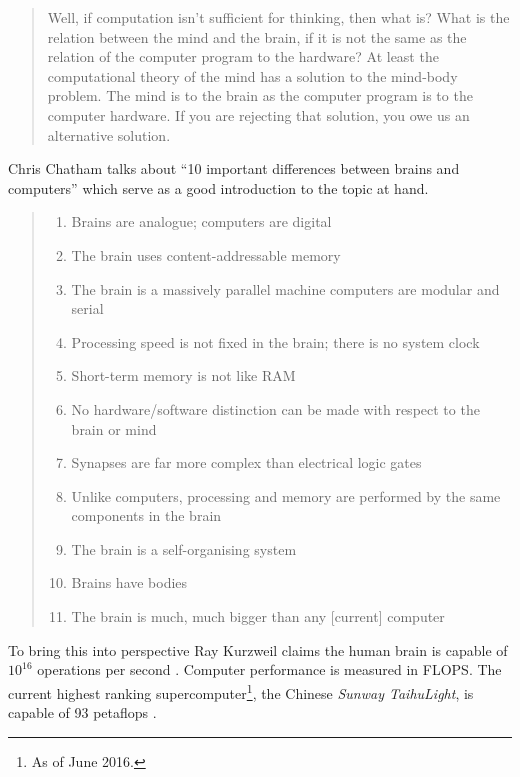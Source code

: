 \begin{quotation}
  Well, if computation isn’t sufficient for thinking, then what is? What is the relation between the mind and the brain, if it is not the same as the relation of the computer program to the hardware? At least the computational theory of the mind has a solution to the mind-body problem. The mind is to the brain as the computer program is to the computer hardware. If you are rejecting that solution, you owe us an alternative solution.
\end{quotation}

Chris Chatham talks about ``10 important differences between brains and computers'' \autocite*{Chatham2007} which serve as a good introduction to the topic at hand.

\begin{quotation}
  \begin{enumerate}
    \item Brains are analogue; computers are digital
    \item The brain uses content-addressable memory
    \item The brain is a massively parallel machine computers are modular and serial
    \item Processing speed is not fixed in the brain; there is no system clock
    \item Short-term memory is not like RAM
    \item No hardware/software distinction can be made with respect to the brain or mind
    \item Synapses are far more complex than electrical logic gates
    \item Unlike computers, processing and memory are performed by the same components in the brain
    \item The brain is a self-organising system
    \item Brains have bodies
    \item	The brain is much, much bigger than any [current] computer
  \end{enumerate}
\end{quotation}

To bring this into perspective Ray Kurzweil claims the human brain is capable of $10^{16}$ operations per second \autocite*{Kurzweil2013}. Computer performance is measured in \ac{FLOPS}. The current highest ranking supercomputer\footnote{As of June 2016.}, the Chinese \textit{Sunway TaihuLight}, is capable of 93 petaflops \autocite{Fu2016,Top2016}.

